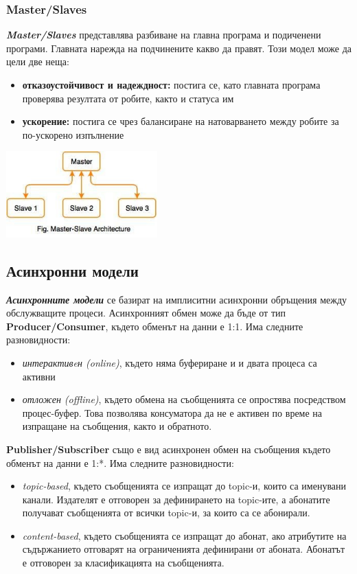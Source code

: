 \documentclass[fleqn,12pt]{article}
\begin{document}
\subsubsection{Master/Slaves}
\textbf{\textit{Master/Slaves}} представлява разбиване на главна програма и подиченени програми.
Главната нарежда на подчинените какво да правят. Този модел може да цели две неща:
\begin{itemize}
    \item \textbf{отказоустойчивост и надеждност:} постига се, като главната програма проверява резултата от робите, както и статуса им
    \item \textbf{ускорение:} постига се чрез балансиране на натоварването между робите за по-ускорено изпълнение
\end{itemize}


\begin{center} \includegraphics[width=220px]{master_slave.jpg} \end{center}

\subsection{Асинхронни модели}

\textbf{\textit{Асинхронните модели}} се базират на имплиситни асинхронни обръщения между обслужващите процеси.
\bigbreak
Асинхронният обмен може да бъде от тип \textbf{Producer/Consumer}, където обменът на данни е 1:1.
Има следните разновидности:
\begin{itemize}
    \item \textit{интерактивeн (online)}, където няма буфериране и и двата процеса са активни
    \item \textit{отложен (offline)}, където обмена на съобщенията се опростява посредством процес-буфер.
    Това позволява консуматора да не е активен по време на изпращане на съобщения, както и обратното.
\end{itemize}
\bigbreak
\textbf{Publisher/Subscriber} също е вид асинхронен обмен на съобщения където обменът на данни е 1:*.
Има следните разновидности:
\begin{itemize}
    \item \textit{topic-based}, където съобщенията се изпращат до topic-и, които са именувани канали.
    Издателят е отговорен за дефинирането на topic-ите, а абонатите получават съобщенията от всички topic-и, за които са се абонирали.
    \item \textit{content-based}, където съобщенията се изпращат до абонат, ако атрибутите на съдържанието отговарят на ограниченията дефинирани от абоната.
    Абонатът е отговорен за класификацията на съобщенията.
\end{itemize}
\end{document}
